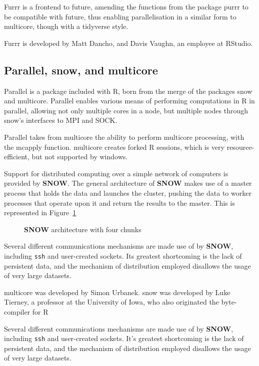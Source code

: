 Furrr is a frontend to future, amending the functions from the package
purrr to be compatible with future, thus enabling parallelisation in a
similar form to multicore, though with a tidyverse
style\cite{vaughan18}.

Furrr is developed by Matt Dancho, and Davis Vaughn, an employee at
RStudio.

\hypertarget{sec:parall-snow-mult}{%
    \subsection{Parallel, snow, and multicore}\label{sec:parall-snow-mult}}

Parallel is a package included with R, born from the merge of the
packages snow and multicore\cite{core:_packag}. Parallel enables
various means of performing computations in R in parallel, allowing not
only multiple cores in a node, but multiple nodes through snow's
interfaces to MPI and SOCK\cite{tierney18}.

Parallel takes from multicore the ability to perform multicore
processing, with the mcapply function. multicore creates forked R
sessions, which is very resource-efficient, but not supported by
windows.

Support for distributed computing over a simple network of computers is provided by \textbf{SNOW}.
The general architecture of \textbf{SNOW} makes use of a master process that holds the data and launches the cluster, pushing the data to worker processes that operate upon it and return the results to the master.
This is represented in Figure~\cref{fig:snow}

\begin{figure}[H]

\caption{\label{fig:snow} \textbf{SNOW} architecture with four chunks}
\end{figure}

Several different communications mechanisms are made use of by \textbf{SNOW}, including \texttt{ssh} and user-created sockets.
Its greatest shortcoming is the lack of persistent data, and the mechanism of distribution employed disallows the usage of very large datasets.

multicore was developed by Simon Urbanek. snow was developed by Luke
Tierney, a professor at the University of Iowa, who also originated the
byte-compiler for R

Several different communications mechanisms are made use of by \textbf{SNOW}, including \texttt{ssh} and user-created sockets.
It's greatest shortcoming is the lack of persistent data, and the mechanism of distribution employed disallows the usage of very large datasets.

